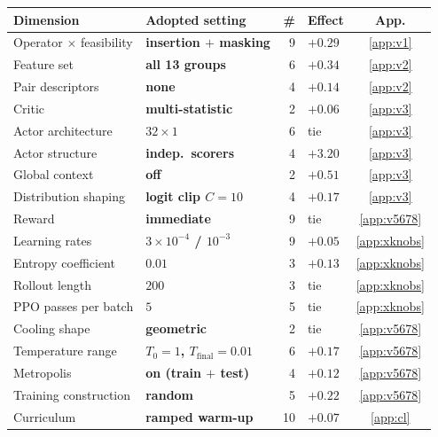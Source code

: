 \documentclass[letterpaper]{article} %
\begin{document}
\begin{table}[t]
\centering
\footnotesize
\setlength{\tabcolsep}{3pt}
\begin{tabular}{@{}llrlc@{}}
\toprule
\textbf{Dimension} & \textbf{Adopted setting} & \textbf{\#} & \textbf{Effect} & \textbf{App.} \\
\midrule
Operator $\times$ feasibility & \textbf{insertion $+$ masking} & 9 & $+0.29$ & \ref{app:v1} \\
Feature set & \textbf{all 13 groups} & 6 & $+0.34$ & \ref{app:v2} \\
Pair descriptors & \textbf{none} & 4 & $+0.14$ & \ref{app:v2} \\
Critic & \textbf{multi-statistic} & 2 & $+0.06$ & \ref{app:v3} \\
Actor architecture & \textbf{\boldmath$32 \times 1$} & 6 & tie & \ref{app:v3} \\
Actor structure & \textbf{indep.\ scorers} & 4 & $+3.20$ & \ref{app:v3} \\
Global context & \textbf{off} & 2 & $+0.51$ & \ref{app:v3} \\
Distribution shaping & \textbf{\boldmath logit clip $C{=}10$} & 4 & $+0.17$ & \ref{app:v3} \\
Reward & \textbf{immediate} & 9 & tie & \ref{app:v5678} \\
Learning rates & \textbf{\boldmath$3{\times}10^{-4}$ / $10^{-3}$} & 9 & $+0.05$ & \ref{app:xknobs} \\
Entropy coefficient & \textbf{\boldmath$0.01$} & 3 & $+0.13$ & \ref{app:xknobs} \\
Rollout length & \textbf{\boldmath$200$} & 3 & tie & \ref{app:xknobs} \\
PPO passes per batch & \textbf{\boldmath$5$} & 5 & tie & \ref{app:xknobs} \\
Cooling shape & \textbf{geometric} & 2 & tie & \ref{app:v5678} \\
Temperature range & \textbf{\boldmath$T_0{=}1$, $T_{\mathrm{final}}{=}0.01$} & 6 & $+0.17$ & \ref{app:v5678} \\
Metropolis & \textbf{on (train $+$ test)} & 4 & $+0.12$ & \ref{app:v5678} \\
Training construction & \textbf{random} & 5 & $+0.22$ & \ref{app:v5678} \\
Curriculum & \textbf{ramped warm-up} & 10 & $+0.07$ & \ref{app:cl} \\

\end{tabular}
\end{table}
\end{document}
